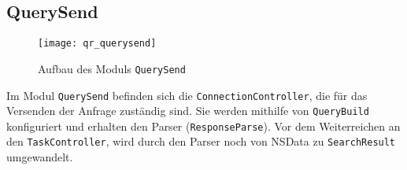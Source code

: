 
\subsection{QuerySend}

\begin{figure}[htb]
	\centering
  	\texttt{[image: qr\_querysend]}
  	\caption{Aufbau des Moduls \lstinline|QuerySend|}
\end{figure}

Im Modul \lstinline|QuerySend| befinden sich die \lstinline|ConnectionController|, die für das Versenden der Anfrage zuständig sind. Sie werden mithilfe von \lstinline|QueryBuild| konfiguriert und erhalten den Parser (\lstinline|ResponseParse|). Vor dem Weiterreichen an den \lstinline|TaskController|, wird durch den Parser noch von NSData zu \lstinline|SearchResult| umgewandelt.